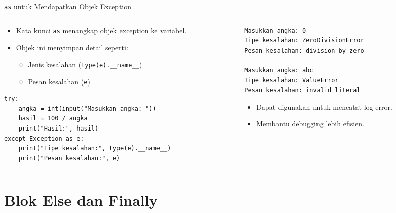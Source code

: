 \documentclass[aspectratio=169, table]{beamer}
\begin{document}
\begin{frame}[fragile]{\texttt{as} untuk Mendapatkan Objek Exception}
\vspace*{10pt}
\begin{columns}[T,totalwidth=\textwidth]
\begin{column}{0.55\textwidth}
\begin{itemize}
  \item Kata kunci \texttt{as} menangkap objek exception ke variabel.
  \item Objek ini menyimpan detail seperti:
  \begin{itemize}
    \item Jenis kesalahan (\texttt{type(e).__name__})
    \item Pesan kesalahan (\texttt{e})
  \end{itemize}
\end{itemize}

\begin{lstlisting}[style=PythonStyle]
try:
    angka = int(input("Masukkan angka: "))
    hasil = 100 / angka
    print("Hasil:", hasil)
except Exception as e:
    print("Tipe kesalahan:", type(e).__name__)
    print("Pesan kesalahan:", e)
\end{lstlisting}
\end{column}

\begin{column}{0.4\textwidth}
\begin{lstlisting}[language=bash]
Masukkan angka: 0
Tipe kesalahan: ZeroDivisionError
Pesan kesalahan: division by zero

Masukkan angka: abc
Tipe kesalahan: ValueError
Pesan kesalahan: invalid literal
\end{lstlisting}

\begin{itemize}
  \item Dapat digunakan untuk mencatat log error.
  \item Membantu debugging lebih efisien.
\end{itemize}
\end{column}
\end{columns}
\end{frame}


\section{Blok Else dan Finally}

\end{document}
